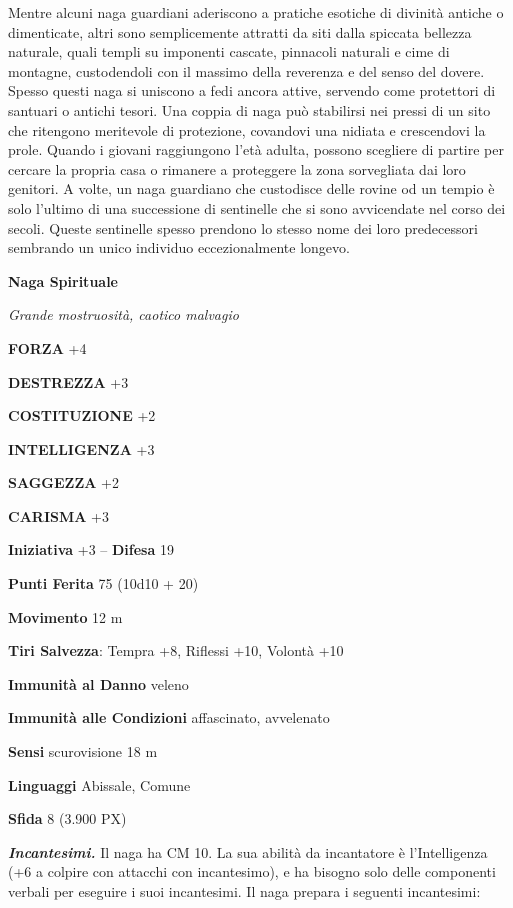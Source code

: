 \begin{multicols}{2}
Mentre alcuni naga guardiani aderiscono a pratiche esotiche di divinità antiche o dimenticate, altri sono semplicemente attratti da siti dalla spiccata bellezza naturale, quali templi su imponenti cascate, pinnacoli naturali e cime di montagne, custodendoli con il massimo della reverenza e del senso del dovere. Spesso questi naga si uniscono a fedi ancora attive, servendo come protettori di santuari o antichi tesori. Una coppia di naga può stabilirsi nei pressi di un sito che ritengono meritevole di protezione, covandovi una nidiata e crescendovi la prole. Quando i giovani raggiungono l'età adulta, possono scegliere di partire per cercare la propria casa o rimanere a proteggere la zona sorvegliata dai loro genitori. A volte, un naga guardiano che custodisce delle rovine od un tempio è solo l'ultimo di una successione di sentinelle che si sono avvicendate nel corso dei secoli. Queste sentinelle spesso prendono lo stesso nome dei loro predecessori sembrando un unico individuo eccezionalmente longevo.


\medskip{}\textbf{Naga Spirituale}

\textit{Grande mostruosità, caotico malvagio}

\textbf{FORZA} +4

\textbf{DESTREZZA} +3

\textbf{COSTITUZIONE} +2

\textbf{INTELLIGENZA} +3

\textbf{SAGGEZZA} +2

\textbf{CARISMA} +3

\textbf{Iniziativa} +3 -- \textbf{Difesa} 19

\textbf{Punti Ferita} 75 (10d10 + 20)

\textbf{Movimento} 12 m

\textbf{Tiri Salvezza}: Tempra +8, Riflessi +10, Volontà +10

\textbf{Immunità al Danno} veleno

\textbf{Immunità alle Condizioni} affascinato, avvelenato

\textbf{Sensi} scurovisione 18 m

\textbf{Linguaggi} Abissale, Comune

\textbf{Sfida} 8 (3.900 PX)

\textit{\textbf{Incantesimi.}} Il naga ha CM 10. La sua abilità da incantatore è l'Intelligenza (+6 a colpire con attacchi con incantesimo), e ha bisogno solo delle componenti verbali per eseguire i suoi incantesimi. Il naga prepara i seguenti incantesimi:


\end{multicols}

